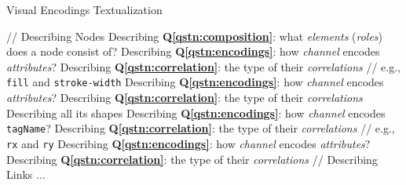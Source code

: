 \begin{algorithm}[!t]
    \renewcommand\arraystretch{1.2}
    \caption{ Visual Encodings Textualization }
    \label{alg:textualize}
    \begin{algorithmic}[1]
        \State // Describing Nodes
        \State Describing \textbf{Q\ref{qstn:composition}}: what \textit{elements} (\textit{roles}) does a node consist of? \label{alg:VsEnNodeConsist}
         \label{alg:VsEnEachRole}
                    \State Describing \textbf{Q\ref{qstn:encodings}}: how \textit{channel} encodes \textit{attributes}? \label{alg:VsEnQ2-1}
                    \State Describing \textbf{Q\ref{qstn:correlation}}: the type of their \textit{correlations}
                    \label{alg:VsEnQ3-1}
                \EndFor
            \EndIf
                    \State // e.g., \texttt{fill} and \texttt{stroke-width}
                    \State Describing \textbf{Q\ref{qstn:encodings}}: how \textit{channel} encodes \textit{attributes}? \label{alg:VsEnQ2-2}
                    \State Describing \textbf{Q\ref{qstn:correlation}}: the type of their \textit{correlations}
                    \label{alg:VsEnQ3-2}
                \EndFor
                \State Describing all its shapes \label{alg:VsEnTagName}
                    \State Describing \textbf{Q\ref{qstn:encodings}}: how \textit{channel} encodes \texttt{tagName}? \label{alg:VsEnQ2-3}
                    \State Describing \textbf{Q\ref{qstn:correlation}}: the type of their \textit{correlations}
                    \label{alg:VsEnQ3-3}
                        \State // e.g., \texttt{rx} and \texttt{ry}
                        \State Describing \textbf{Q\ref{qstn:encodings}}: how \textit{channel} encodes \textit{attributes}? \label{alg:VsEnQ2-4}
                        \State Describing \textbf{Q\ref{qstn:correlation}}: the type of their \textit{correlations} \label{alg:VsEnQ3-4}
                    \EndFor
                \EndFor
            \EndIf
        \EndFor
        \State // Describing Links ...
    \end{algorithmic}
\end{algorithm}

